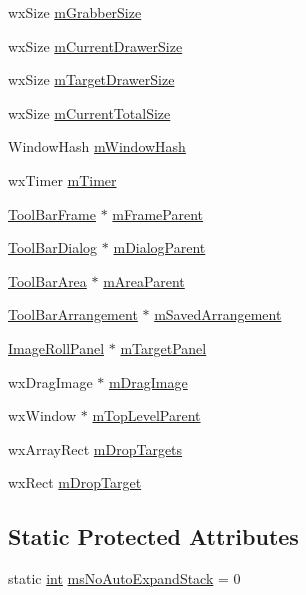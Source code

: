 \begin{DoxyCompactItemize}
wx\+Size \hyperlink{class_expanding_tool_bar_ae7f6393e15ef2b4b10406a7ab46fe93b}{m\+Grabber\+Size}
\item 
wx\+Size \hyperlink{class_expanding_tool_bar_afc634ddc6db5c9e793250f45e8367ce4}{m\+Current\+Drawer\+Size}
\item 
wx\+Size \hyperlink{class_expanding_tool_bar_abc91f2699afd19e8cc0da9ba7e4a072c}{m\+Target\+Drawer\+Size}
\item 
wx\+Size \hyperlink{class_expanding_tool_bar_af3ea6ec61447606102b1cfdc972b1c82}{m\+Current\+Total\+Size}
\item 
Window\+Hash \hyperlink{class_expanding_tool_bar_a42aeff8120f7e0b22abf586f6f9b930e}{m\+Window\+Hash}
\item 
wx\+Timer \hyperlink{class_expanding_tool_bar_a36c716937d5f9ebe9a0f3a1aa357f17a}{m\+Timer}
\item 
\hyperlink{class_tool_bar_frame}{Tool\+Bar\+Frame} $\ast$ \hyperlink{class_expanding_tool_bar_ab3f969637ce6c056c38a41be048832bd}{m\+Frame\+Parent}
\item 
\hyperlink{class_tool_bar_dialog}{Tool\+Bar\+Dialog} $\ast$ \hyperlink{class_expanding_tool_bar_ac95afc6918352f7ab788483aed8ef677}{m\+Dialog\+Parent}
\item 
\hyperlink{class_tool_bar_area}{Tool\+Bar\+Area} $\ast$ \hyperlink{class_expanding_tool_bar_a2e13d63d7c88d42b3179c90afffa0971}{m\+Area\+Parent}
\item 
\hyperlink{class_tool_bar_arrangement}{Tool\+Bar\+Arrangement} $\ast$ \hyperlink{class_expanding_tool_bar_a5da27df2d33806b1c504715770386e0d}{m\+Saved\+Arrangement}
\item 
\hyperlink{class_image_roll_panel}{Image\+Roll\+Panel} $\ast$ \hyperlink{class_expanding_tool_bar_ab44c26c8f8580848e45e09a37c6d81e1}{m\+Target\+Panel}
\item 
wx\+Drag\+Image $\ast$ \hyperlink{class_expanding_tool_bar_a22d583cf513d758678fccb788e6d91bc}{m\+Drag\+Image}
\item 
wx\+Window $\ast$ \hyperlink{class_expanding_tool_bar_a062e8b1b2eb909c73b24638f05027c18}{m\+Top\+Level\+Parent}
\item 
wx\+Array\+Rect \hyperlink{class_expanding_tool_bar_ac8aa30f137606f247613d02857d36951}{m\+Drop\+Targets}
\item 
wx\+Rect \hyperlink{class_expanding_tool_bar_a5333ab3447084c7a05a2c5bdb22fd375}{m\+Drop\+Target}
\end{DoxyCompactItemize}
\subsection*{Static Protected Attributes}
\begin{DoxyCompactItemize}
\item 
static \hyperlink{xmltok_8h_a5a0d4a5641ce434f1d23533f2b2e6653}{int} \hyperlink{class_expanding_tool_bar_a5e0fb0df1fd56086a170d4eb1d0f4c30}{ms\+No\+Auto\+Expand\+Stack} = 0
\end{DoxyCompactItemize}
